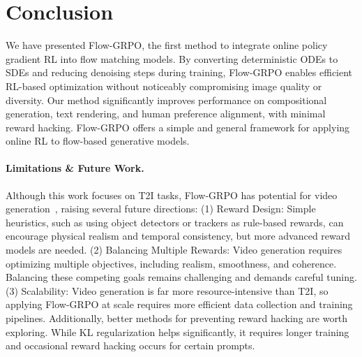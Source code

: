 
\section{Conclusion}
We have presented Flow-GRPO, the first method to integrate online policy gradient RL into flow matching models. By converting deterministic ODEs to SDEs and reducing denoising steps during training, Flow-GRPO enables efficient RL-based optimization without noticeably compromising image quality or diversity.
Our method significantly improves performance on compositional generation, text rendering, and human preference alignment, with minimal reward hacking. Flow-GRPO offers a simple and general framework for applying online RL to flow-based generative models.

\label{sec:limitation}
\paragraph{Limitations \& Future Work.} 
Although this work focuses on T2I tasks, Flow-GRPO has potential for video generation~\cite{wanx, hunyuanvideo}, raising several future directions: (1) Reward Design: Simple heuristics, such as using object detectors or trackers as rule-based rewards, can encourage physical realism and temporal consistency, but more advanced reward models are needed.
(2) Balancing Multiple Rewards: Video generation requires optimizing multiple objectives, including realism, smoothness, and coherence. Balancing these competing goals remains challenging and demands careful tuning.
(3) Scalability: Video generation is far more resource-intensive than T2I, so applying Flow-GRPO at scale requires more efficient data collection and training pipelines. Additionally, better methods for preventing reward hacking are worth exploring. While KL regularization helps significantly, it requires longer training and occasional reward hacking occurs for certain prompts.

